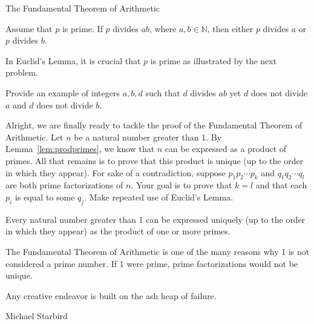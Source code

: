 \begin{section}{The Fundamental Theorem of Arithmetic}
\begin{theorem}\label{thm:Euclid}
Assume that $p$ is prime.  If $p$ divides $ab$, where $a,b\in\mathbb{N}$, then either $p$ divides $a$ or $p$ divides $b$.
\end{theorem}

In Euclid's Lemma, it is crucial that $p$ is prime as illustrated by the next problem.

\begin{problem}
Provide an example of integers $a, b, d$ such that $d$ divides $ab$ yet $d$ does not divide $a$ and $d$ does not divide $b$.
\end{problem}

Alright, we are finally ready to tackle the proof of the Fundamental Theorem of Arithmetic. Let $n$ be a natural number greater than 1. By Lemma~\ref{lem:prodprimes}, we know that $n$ can be expressed as a product of primes.  All that remains is to prove that this product is unique (up to the order in which they appear). For sake of a contradiction, suppose $p_1 p_2 \cdots p_k$ and $q_1 q_2 \cdots q_l$ are both prime factorizations of $n$.  Your goal is to prove that $k=l$ and that each $p_i$ is equal to some $q_j$. Make repeated use of Euclid's Lemma.

\begin{theorem}\label{thm:FTA}
Every natural number greater than 1 can be expressed uniquely (up to the order in which they appear) as the product of one or more primes.
\end{theorem}

The Fundamental Theorem of Arithmetic is one of the many reasons why 1 is not considered a prime number. If 1 were prime, prime factorizations would not be unique.

\epigraph{Any creative endeavor is built on the ash heap of failure.}{Michael Starbird}

\end{section}